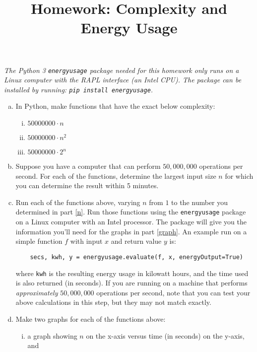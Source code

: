 \documentclass[12pt]{amsart}
\title{Homework: Complexity and Energy Usage}
\date{} %
\begin{document}
\maketitle

\noindent \emph{The Python 3 \texttt{energyusage} package needed for this homework only runs on a Linux computer with the RAPL interface (an Intel CPU).  The package can be installed by running: \texttt{pip install energyusage}.}


\begin{enumerate}[a)]
\item In Python, make functions that have the exact below complexity:
	\begin{enumerate}[i)]
	\item $50000000 \cdot n$
	\item $50000000 \cdot n^2$
	\item $50000000 \cdot 2^n$
	\end{enumerate}
\item \label{n} Suppose you have a computer that can perform $50,000,000$ operations per second.  For each of the functions, determine the largest input size $n$ for which you can determine the result within 5 minutes.
\item Run each of the functions above, varying $n$ from $1$ to the number you determined in part \ref{n}.  Run those functions using the \texttt{energyusage} package on a Linux computer with an Intel processor.  The package will give you the information you'll need for the graphs in part \ref{graph}.  An example run on a simple function $f$ with input $x$ and return value $y$ is:
	\begin{verbatim}
	secs, kwh, y = energyusage.evaluate(f, x, energyOutput=True)
	\end{verbatim}
where \texttt{kwh} is the resulting energy usage in kilowatt hours, and the time used is also returned (in seconds).   If you are running on a machine that performs \emph{approximately} $50,000,000$ operations per second, note that you can test your above calculations in this step, but they may not match exactly.
\item \label{graph} Make two graphs for each of the functions above:
	\begin{enumerate}[i)]
	\item a graph showing $n$ on the x-axis versus time (in seconds) on the y-axis, and

\end{enumerate}
\end{enumerate}
\end{document}

